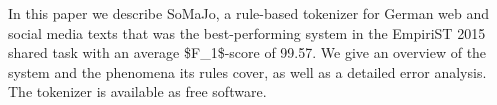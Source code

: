 In this paper we describe SoMaJo, a rule-based tokenizer for German web and social media texts that was the best-performing system in the EmpiriST 2015 shared task with an average \$F\_1\$-score of 99.57. We give an overview of the system and the phenomena its rules cover, as well as a detailed error analysis. The tokenizer is available as free software.
